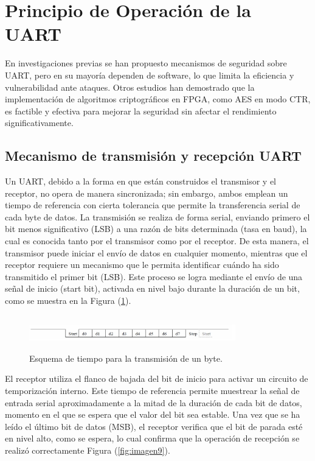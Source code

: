\section{Principio de Operación de la UART}
En investigaciones previas se han propuesto mecanismos de seguridad sobre UART, pero en su mayoría dependen de software, lo que limita la eficiencia y vulnerabilidad ante ataques. Otros estudios han demostrado que la implementación de algoritmos criptográficos en FPGA, como AES en modo CTR, es factible y efectiva para mejorar la seguridad sin afectar el rendimiento significativamente.

\subsection{Mecanismo de transmisión y recepción UART}

Un UART, debido a la forma en que están construidos el transmisor y el receptor, no opera de manera sincronizada; sin embargo, ambos emplean un tiempo de referencia con cierta tolerancia que permite la transferencia serial de cada byte de datos. La transmisión se realiza de forma serial, enviando primero el bit menos significativo (LSB) a una razón de bits determinada (tasa en baud), la cual es conocida tanto por el transmisor como por el receptor. De esta manera, el transmisor puede iniciar el envío de datos en cualquier momento, mientras que el receptor requiere un mecanismo que le permita identificar cuándo ha sido transmitido el primer bit (LSB). Este proceso se logra mediante el envío de una señal de inicio (start bit), activada en nivel bajo durante la duración de un bit, como se muestra en la Figura (\ref{fig:imagen8}).

\begin{figure}[h!] %
    \centering %
     \includegraphics[width=0.8\textwidth, height=1.5cm]{imagenes/img8} %
    \caption{ Esquema de tiempo para la transmisión de un byte.}
    \label{fig:imagen8} %
\end{figure} 

El receptor utiliza el flanco de bajada del bit de inicio para activar un circuito de temporización interno. Este tiempo de referencia permite muestrear la señal de entrada serial aproximadamente a la mitad de la duración de cada bit de datos, momento en el que se espera que el valor del bit sea estable. Una vez que se ha leído el último bit de datos (MSB), el receptor verifica que el bit de parada esté en nivel alto, como se espera, lo cual confirma que la operación de recepción se realizó correctamente Figura (\ref{fig:imagen9}).

